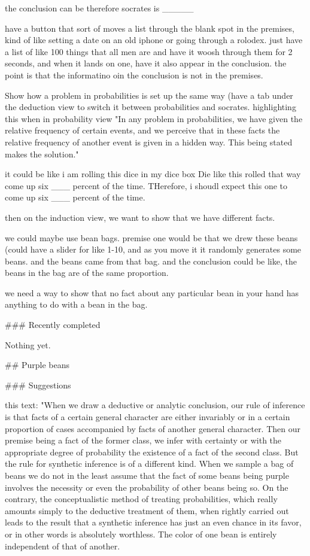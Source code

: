 the conclusion can be therefore socrates is _____

have a button that sort of moves a list through the blank spot in the premises, kind of like setting a date on an old iphone or going through a rolodex. just have a list of like 100 things that all men are and have it woosh through them for 2 seconds, and when it lands on one, have it also appear in the conclusion.
the point is that the informatino oin the conclusion is not in the premises.

Show how a problem in probabilities is set up the same way (have a tab under the deduction view to switch it between probabilities and socrates. highlighting this when in probability view "In any problem in probabilities, we have given the relative frequency of certain events, and we perceive that in these facts the relative frequency of another event is given in a hidden way. This being stated makes the solution."

it could be like i am rolling this dice in my dice box
Die like this rolled that way come up six ___ percent of the time.
THerefore, i shoudl expect this one to come up six ___ percent of the time.



then on the induction view, we want to show that we have different facts.

we could maybe use bean bags. premise one would be that we drew these beans  (could have a slider for like 1-10, and as you move it it randomly generates some beans.
and the beans came from that bag.
and the conclusion could be like, the beans in the bag are of the same proportion.

we need a way to show that no fact about any particular bean in your hand has anything to do with a bean in the bag.

### Recently completed

Nothing yet.


## Purple beans

### Suggestions

this text:
"When we draw a deductive or analytic conclusion, our rule of inference is that facts of a certain general character are either invariably or in a certain proportion of cases accompanied by facts of another general character. Then our premise being a fact of the former class, we infer with certainty or with the appropriate degree of probability the existence of a fact of the second class. But the rule for synthetic inference is of a different kind. When we sample a bag of beans we do not in the least assume that the fact of some beans being purple involves the necessity or even the probability of other beans being so. On the contrary, the conceptualistic method of treating probabilities, which really amounts simply to the deductive treatment of them, when rightly carried out leads to the result that a synthetic inference has just an even chance in its favor, or in other words is absolutely worthless. The color of one bean is entirely independent of that of another.

